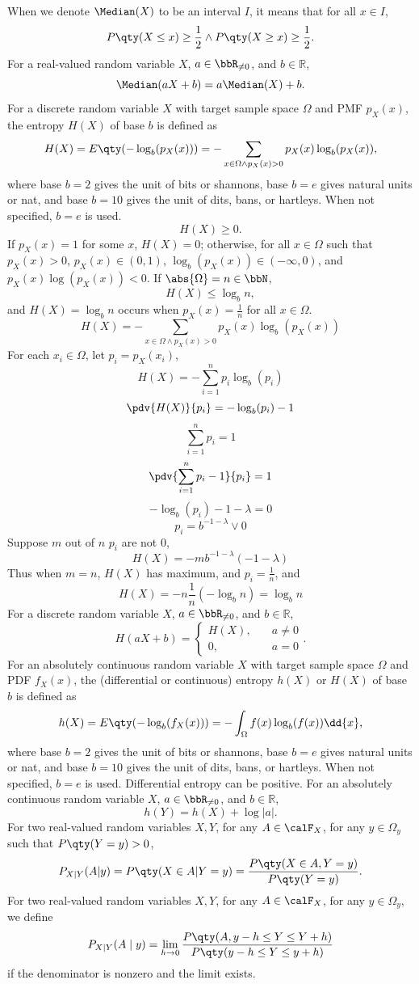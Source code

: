 \documentclass[a4paper,12pt]{report}
\begin{document}
When we denote $\Median(X)$ to be an interval $I$, it means that for all $x\in I$,
\[P\qty(X\leq x)\geq\frac{1}{2}\land P\qty(X\geq x)\geq\frac{1}{2}.\]
For a real-valued random variable $X$, $a\in\bbR_{\neq0}$, and $b\in\mathbb{R}$,
\[\Median(aX+b)=a\Median(X)+b.\]
For a discrete random variable $X$ with target sample space $\Omega$ and PMF $p_X(x)$, the entropy $H(X)$ of base $b$ is defined as
\[H(X)=E\qty(-\log_b(p_X(x)))=-\sum_{x\in\Omega\land p_X(x)>0}p_X(x)\log_b(p_X(x)),\]
where base $b=2$ gives the unit of bits or shannons, base $b=e$ gives natural units or nat, and base $b=10$ gives the unit of dits, bans, or hartleys. When not specified, $b=e$ is used.
\[H(X)\ge 0.\]
\bpr
If $p_X(x)=1$ for some $x$, $H(X)=0$; otherwise, for all $x\in\Omega$ such that $p_X(x)>0$, $p_X(x)\in(0,1)$, $\log_b(p_X(x))\in(-\infty,0)$, and $p_X(x)\log(p_X(x))<0$.
\epr
{}
If $\abs{\Omega}=n\in\bbN$,
\[H(X)\le\log_bn,\]
and $H(X)=\log_bn$ occurs when $p_X(x)=\frac{1}{n}$ for all $x\in\Omega$.
\bpr
\[H(X)=-\sum_{x\in\Omega\land p_X(x)>0}p_X(x)\log_b(p_X(x))\]
For each $x_i\in\Omega$, let $p_i=p_X(x_i)$,
\[H(X)=-\sum_{i=1}^np_i\log_b(p_i)\]
\[\pdv{H(X)}{p_i}=-\log_b(p_i)-1\]
\[\sum_{i=1}^np_i=1\]
\[\pdv{\sum_{i=1}^np_i-1}{p_i}=1\]
\[-\log_b(p_i)-1-\lambda=0\]
\[p_i=b^{-1-\lambda}\lor0\]
Suppose $m$ out of $n$ $p_i$ are not $0$,
\[H(X)=-mb^{-1-\lambda}(-1-\lambda)\]
Thus when $m=n$, $H(X)$ has maximum, and $p_i=\frac{1}{n}$, and
\[H(X)=-n\frac{1}{n}(-\log_bn)=\log_bn\]
\epr
{}
For a discrete random variable $X$, $a\in\bbR_{\neq0}$, and $b\in\mathbb{R}$,
\[H(aX+b)=\begin{cases}H(X),\quad &a\neq 0\\0,\quad &a=0\end{cases}.\]
For an absolutely continuous random variable $X$ with target sample space $\Omega$ and PDF $f_X(x)$, the (differential or continuous) entropy $h(X)$ or $H(X)$ of base $b$ is defined as
\[h(X)=E\qty(-\log_b(f_X(x)))=-\int_{\Omega}f(x)\log_b(f(x))\dd{x},\]
where base $b=2$ gives the unit of bits or shannons, base $b=e$ gives natural units or nat, and base $b=10$ gives the unit of dits, bans, or hartleys. When not specified, $b=e$ is used. Differential entropy can be positive.
For an absolutely continuous random variable $X$, $a\in\bbR_{\neq0}$, and $b\in\mathbb{R}$,
\[h(Y)=h(X)+\log|a|.\]
For two real-valued random variables $X,Y$, for any $A\in\calF_X$, for any $y\in\Omega_y$ such that $P\qty(Y=y)>0$,
\[P_{X|Y}(A|y)=P\qty(X\in A|Y=y)=\frac{P\qty(X\in A,Y=y)}{P\qty(Y=y)}.\]
For two real-valued random variables $X,Y$, for any $A\in\calF_X$, for any $y\in\Omega_y$, we define
\[P_{X|Y}(A\mid y)=\lim_{h\to0}\frac{P\qty(A,y-h\le Y\le Y+h)}{P\qty(y-h\le Y\le y+h)}\]
if the denominator is nonzero and the limit exists.
\end{document}

